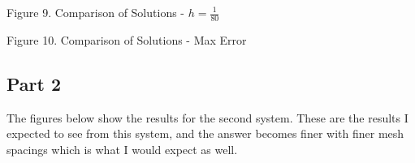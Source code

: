 \documentclass[11pt, oneside]{article}   	%
\begin{document}
\centerline {}
\centerline{Figure 9. Comparison of Solutions - $h = \frac{1}{80}$}

\centerline {}
\centerline{Figure 10. Comparison of Solutions - Max Error}

\subsection{Part 2}

The figures below show the results for the second system. These are the results I expected to see from this system, and the answer becomes finer with finer mesh spacings which is what I would expect as well.
\end{document}
